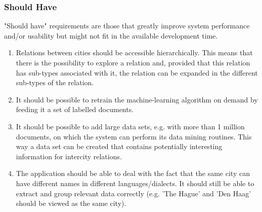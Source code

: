 \subsubsection {Should Have}
"Should have" requirements are those that greatly improve system performance and/or usability but might not fit in the available development time.

\begin{enumerate}
    \item Relations between cities should be accessible hierarchically. This means that there is the possibility to explore a relation and, provided that this relation has sub-types associated with it, the relation can be expanded in the different sub-types of the relation.
    \item It should be possible to retrain the machine-learning algorithm on demand by feeding it a set of labelled documents.
    \item It should be possible to add large data sets, e.g. with more than 1 million documents, on which the system can perform its data mining routines. This way a data set can be created that contains potentially interesting information for intercity relations.
    \item The application should be able to deal with the fact that the same city can have different names in different languages/dialects. It should still be able to extract and group relevant data correctly (e.g. 'The Hague' and 'Den Haag' should be viewed as the same city).
\end{enumerate}
\iffalse
